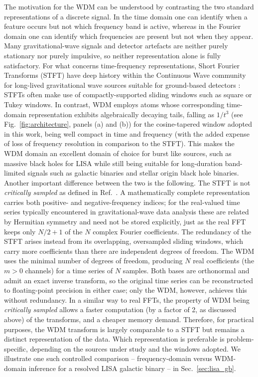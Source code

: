 \documentclass[twocolumn,preprintnumbers,
  superscriptaddress,
  nofootinbib,
  amsmath,
  amssymb,
  aps,
  prd,
  colorlinks=true,
  linkcolor=blue,
  urlcolor=blue,
  citecolor=blue,
  anchorcolor=blue
]{revtex4-2}
\begin{document}
The motivation for the WDM can be understood by contrasting the two standard representations of a discrete signal. In the time domain one can identify when a feature occurs but not which frequency band is active, whereas in the Fourier domain one can identify which frequencies are present but not when they appear. Many gravitational-wave signals and detector artefacts are neither purely stationary nor purely impulsive, so neither representation alone is fully satisfactory.
For what concerns time-frequency representations, Short Fourier Transforms (STFT) have deep history within the Continuous Wave community for long-lived gravitational wave sources suitable for ground-based detectors \cite{Krishnan:2004sv,Palomba_2005}: STFTs often make use of compactly-supported sliding windows such as square or Tukey windows. In contrast, WDM employs atoms whose corresponding time-domain representation exhibits algebraically decaying tails, falling as $1/t^3$ (see Fig.~\ref{fig:architecture}, panels (a) and (b)) for the cosine-tapered window adopted in this work, being well compact in time and frequency (with the added expense of loss of frequency resolution in comparison to the STFT).
This makes the WDM domain an excellent domain of choice for burst like sources, such as massive black holes for LISA while still being suitable for long-duration band-limited signals such as galactic binaries and stellar origin black hole binaries.
Another important
difference between the two is the following. 
\color{red}
The STFT is not \textit{critically sampled} as defined in Ref.~\cite{Cornish:2020odn}. A mathematically complete representation carries both positive- and negative-frequency indices; for the real-valued time series typically encountered in gravitational-wave data analysis these are related by Hermitian symmetry and need not be stored explicitly, just as the real FFT keeps only $N/2+1$ of the $N$ complex Fourier coefficients. The redundancy of the STFT arises instead from its overlapping, oversampled sliding windows, which carry more coefficients than there are independent degrees of freedom. The WDM uses the minimal number of degrees of freedom, producing $N$ real coefficients (the $m>0$ channels) for a time series of $N$ samples. Both bases are orthonormal and admit an exact inverse transform, so the original time series can be reconstructed to floating-point precision in either case; only the WDM, however, achieves this without redundancy.
\color{black}
In a similar way to real FFTs, the property of WDM being \textit{critically sampled} allows a faster computation (by a factor of 2, as discussed above) of the transforms, and a cheaper memory demand.
Therefore, for practical purposes, the WDM transform is largely comparable to a STFT but remains a distinct representation of the data. Which representation is preferable is problem-specific, depending on the sources under study and the windows adopted. We illustrate one such controlled comparison -- frequency-domain versus WDM-domain inference for a resolved LISA galactic binary -- in Sec.~\ref{sec:lisa_gb}.
\end{document}
